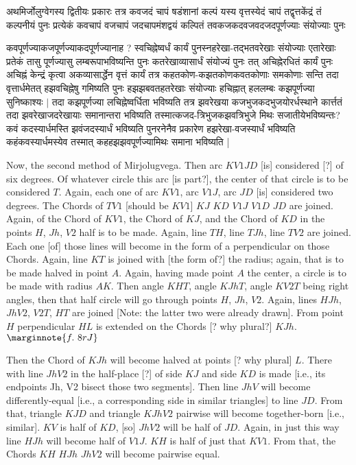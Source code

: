 \documentclass[12pt]{book}
\begin{document}
{\s अथमिर्जोलुग्वेगस्य द्वितीयः प्रकारः तत्र कवजदं चापं षडंशानां कल्पं
यस्य वृत्तस्येदं चापं तद्वृत्तकेंद्रं तं कल्पनीयं पुनः प्रत्येकं कवचापं वजचापं जदचापमंशद्वयं कल्पितं
तवकजकदवजवदजदपूर्णज्याः संयोज्याः पुनः 

कवपूर्णज्याकजपूर्णज्याकदपूर्णज्यानाह ?
स्वचिह्नेष्वर्धं कार्यं पुनस्नहरेखा-तद्भतवरेखाः संयोज्याः एतारेखाः प्रतेकं तासु पूर्णज्यासु लम्बरूपाभविष्यन्ति पुनः कतरेखाव्यासार्धं संयोज्यं पुनः तत् अचिह्नेरधितं कार्यं पुनः अचिह्नं केन्द्रं कृत्वा
अकव्यासार्द्धेन वृत्तं कार्यं तत्र कहतकोण-कझतकोणकवतकोणाः समकोणाः सन्ति तदा वृत्तार्धमेतत् हझवचिह्नेषु गमिष्यति पुनः हझझबवतहतरेखाः संयोज्याः हचिह्नात् हललम्बः कझपूर्णज्या सुनिष्काश्यः $|$
तदा कझपूर्णज्या लचिह्नेष्वर्धिता भविष्यति तत्र झवरेखया कजभुजकदभुजयोरर्धस्थाने कार्त्ततं तदा झवरेखा\-जदरेखायाः समानान्तरा भविष्यति तस्मात्कजद-त्रिभुजकझवत्रिभुजे मिथः सजातीयेभविष्यन्तः? कवं कदस्यार्धमस्ति झवंजदस्यार्धं भविष्यति
पुनरनेनैव प्रकारेण हझरेखा-वजस्यार्धं भविष्यति कहंकवस्यार्धमस्येव तस्मात् कहहझझवपूर्णज्यामिथः समाना भविष्यति |}  

\newpage

Now, the second method of Mirjolugvega. Then arc $KV1JD$ [is] considered [?] of six degrees.
Of whatever circle this arc [is part?], the center of that circle is to be considered $T$. Again, 
each one of arc $KV1$, arc $V1J$, arc $JD$ [is] considered two degrees. The Chords
of $TV1$ [should be $KV1$] $KJ$ $KD$ $V1J$ $V1D$ $JD$ are joined. Again, of the Chord of $KV1$,
the Chord of $KJ$, and the Chord of $KD$ in the points $H$, $Jh$, $V2$ half  is to be made.
Again, line $TH$, line $TJh$, line $TV2$ are  joined. Each one [of] those lines 
will become in the form of a perpendicular on those Chords. 
Again, line $KT$ is joined with [the form of?] the radius; again, that is to be made halved
in point $A$. Again, having made point $A$ the center, a circle is to be made with
radius $AK$. Then angle $KHT$, angle $KJhT$, angle $KV2T$ being right angles, 
then  that half circle will go through points $H$, $Jh$, $V2$. 
Again, lines $HJh$, $JhV2$, $V2T$, $HT$ are joined [Note: the latter two were already
drawn]. From 
point $H$ perpendicular $HL$ is extended on the Chords [? why plural?] $KJh$. 
$\marginnote{f.~8r J}$

Then the Chord of $KJh$ will become halved at points [? why plural] $L$. There with line $JhV2$ 
in the half-place [?] of side $KJ$ and side $KD$ is made [i.e., its endpoints Jh, V2 bisect those 
two segments]. Then line $JhV$ will
become differently-equal [i.e., a corresponding side in similar triangles]
to line $JD$. From that, triangle $KJD$ and triangle
$KJhV2$ pairwise will become together-born [i.e., similar]. 
$KV$ is half of $KD$, [so] $JhV2$ will be half of $JD$.
Again, in just this way line $HJh$ will become half of $V1 J$. $KH$ is half of just that $KV1$.
From that, the Chords $KH$ $HJh$ $JhV2$ will become pairwise equal. 
\end{document}
